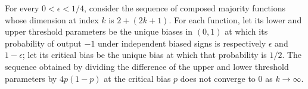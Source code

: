 \begin{theorem}
\label{FABL.composedMajority_hasCoarseThreshold}
\leanok
{}
For every $0<\epsilon<1/4$, consider the sequence of composed majority functions whose
dimension at index $k$ is $2+(2k+1)$. For each function, let its lower and upper
threshold parameters be the unique biases in $(0,1)$ at which its probability of output
$-1$ under independent biased signs is respectively $\epsilon$ and $1-\epsilon$; let its
critical bias be the unique bias at which that probability is $1/2$. The sequence
obtained by dividing the difference of the upper and lower threshold parameters by
$4p(1-p)$ at the critical bias $p$ does not converge to $0$ as $k\to\infty$.
\end{theorem}
